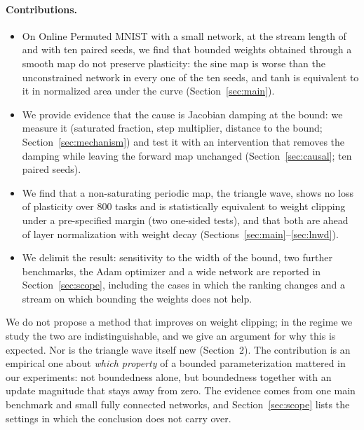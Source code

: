 \documentclass[11pt,a4paper]{article}
\begin{document}
\paragraph{Contributions.}
\begin{itemize}
  \item On Online Permuted MNIST with a small network, at the stream length of \citet{dohare2024loss} and with
        ten paired seeds, we find that bounded weights obtained through a smooth map do not preserve
        plasticity: the sine map is worse than
        the unconstrained network in every one of the ten seeds, and tanh is equivalent to it in normalized
        area under the curve (Section~\ref{sec:main}).
  \item We provide evidence that the cause is Jacobian damping at the bound: we measure it (saturated
        fraction, step multiplier, distance to the bound; Section~\ref{sec:mechanism}) and test it with an
        intervention that removes the damping while leaving the forward map unchanged
        (Section~\ref{sec:causal}; ten paired seeds).
  \item We find that a non-saturating periodic map, the triangle wave, shows no loss of plasticity over 800
        tasks and is statistically equivalent to weight clipping under a pre-specified margin (two one-sided
        tests), and that both are ahead of layer normalization with weight decay (Sections~\ref{sec:main}--\ref{sec:lnwd}).
  \item We delimit the result: sensitivity to the width of the bound, two further benchmarks, the Adam optimizer
        and a wide network are reported in Section~\ref{sec:scope}, including the cases in which the ranking
        changes and a stream on which bounding the weights does not help.
\end{itemize}

We do not propose a method that improves on weight clipping; in the regime we study the two are
indistinguishable, and we give an argument for why this is expected. Nor is the triangle wave itself new
(Section~2). The contribution is an empirical one about \emph{which property} of a bounded parameterization
mattered in our experiments: not boundedness alone, but boundedness together with an update magnitude that
stays away from zero. The evidence comes from one main benchmark and small fully connected networks, and
Section~\ref{sec:scope} lists the settings in which the conclusion does not carry over.

\end{document}
